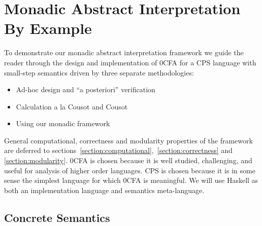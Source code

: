 \documentclass{article}
\begin{document}





\section{Monadic Abstract Interpretation By Example}

To demonstrate our monadic abstract interpretation framework we guide the
reader through the design and implementation of 0CFA for a CPS language with
small-step semantics driven by three separate methodologies:
%
\begin{itemize}
  \item Ad-hoc design and ``a posteriori'' verification
  \item Calculation a la Cousot and Cousot
  \item Using our monadic framework
\end{itemize}
%
General computational, correctness and modularity properties of the framework
are deferred to sections~\ref{section:computational},~\ref{section:correctness}
and \ref{section:modularity}.
%
0CFA is chosen because it is well studied, challenging, and useful for analysis of
higher order languages.
%
CPS is chosen because it is in some sense the simplest language for which 0CFA
is meaningful.
%
We will use Haskell as both an implementation language and semantics
meta-language.

\subsection{Concrete Semantics}
\end{document}
